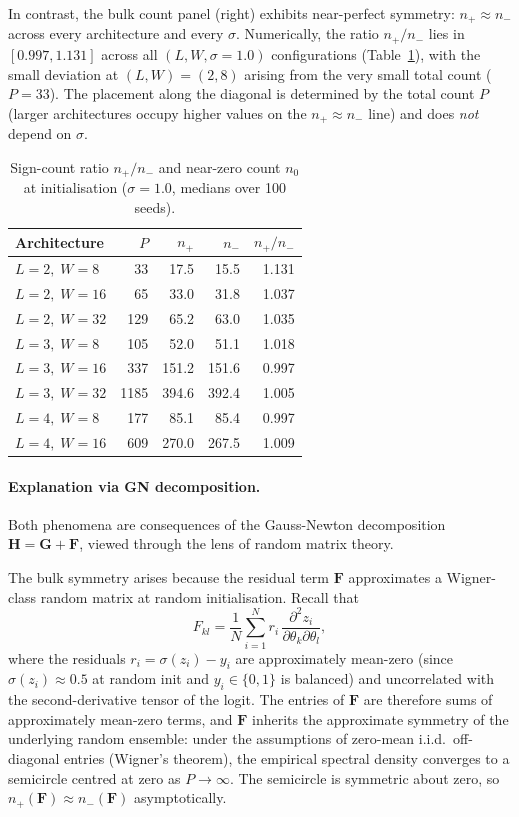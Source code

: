\documentclass[12pt,a4paper]{article}
\newcommand{\bH}{\mathbf{H}}
\newcommand{\bG}{\mathbf{G}}
\newcommand{\bF}{\mathbf{F}}
\newcommand{\sigmoid}{\sigma}
\begin{document}
In contrast, the bulk count panel (right) exhibits near-perfect symmetry: $n_+ \approx n_-$ across every architecture and every $\sigma$. Numerically, the ratio $n_+/n_-$ lies in $[0.997, 1.131]$ across all $(L, W, \sigma=1.0)$ configurations (Table~\ref{tab:archcounts}), with the small deviation at $(L,W)=(2,8)$ arising from the very small total count ($P=33$). The placement along the diagonal is determined by the total count $P$ (larger architectures occupy higher values on the $n_+ \approx n_-$ line) and does \emph{not} depend on $\sigma$.

\begin{table}[H]
  \centering
  \caption{Sign-count ratio $n_+/n_-$ and near-zero count $n_0$ at initialisation
           ($\sigma=1.0$, medians over 100 seeds).}
  \label{tab:archcounts}
  \begin{tabular}{@{}lrrrr@{}}
    \toprule
    Architecture & $P$ & $n_+$ & $n_-$ & $n_+/n_-$ \\
    \midrule
    $L=2,\;W=8$  &  33 & 17.5 & 15.5 & 1.131 \\
    $L=2,\;W=16$ &  65 & 33.0 & 31.8 & 1.037 \\
    $L=2,\;W=32$ & 129 & 65.2 & 63.0 & 1.035 \\
    $L=3,\;W=8$  & 105 & 52.0 & 51.1 & 1.018 \\
    $L=3,\;W=16$ & 337 & 151.2 & 151.6 & 0.997 \\
    $L=3,\;W=32$ & 1185 & 394.6 & 392.4 & 1.005 \\
    $L=4,\;W=8$  & 177 & 85.1 & 85.4 & 0.997 \\
    $L=4,\;W=16$ & 609 & 270.0 & 267.5 & 1.009 \\
    \bottomrule
  \end{tabular}
\end{table}

\paragraph{Explanation via GN decomposition.}
Both phenomena are consequences of the Gauss-Newton decomposition $\bH = \bG + \bF$, viewed through the lens of random matrix theory.

The bulk symmetry arises because the residual term $\bF$ approximates a Wigner-class random matrix at random initialisation. Recall that
\begin{equation*}
  F_{kl} = \frac{1}{N}\sum_{i=1}^N r_i\, \frac{\partial^2 z_i}{\partial \theta_k \partial \theta_l},
\end{equation*}
where the residuals $r_i = \sigmoid(z_i) - y_i$ are approximately mean-zero (since $\sigmoid(z_i) \approx 0.5$ at random init and $y_i \in \{0,1\}$ is balanced) and uncorrelated with the second-derivative tensor of the logit. The entries of $\bF$ are therefore sums of approximately mean-zero terms, and $\bF$ inherits the approximate symmetry of the underlying random ensemble: under the assumptions of zero-mean i.i.d.\ off-diagonal entries (Wigner's theorem), the empirical spectral density converges to a semicircle centred at zero as $P \to \infty$. The semicircle is symmetric about zero, so $n_+(\bF) \approx n_-(\bF)$ asymptotically.
\end{document}
